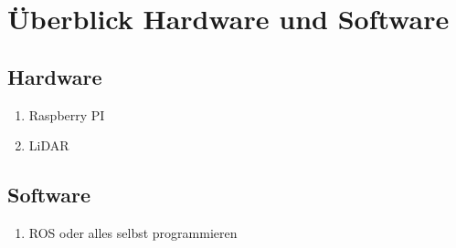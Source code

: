 \section{Überblick Hardware und Software}

\subsection{Hardware}
\begin{enumerate}
    \item Raspberry PI
    \item LiDAR
\end{enumerate}

\subsection{Software}
\begin{enumerate}
    \item ROS oder alles selbst programmieren
\end{enumerate}

\newpage
